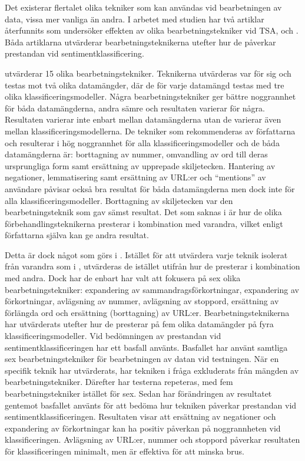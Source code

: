 \documentclass{kaumasters} %
\begin{document}
Det existerar flertalet olika tekniker som kan användas vid bearbetningen av data, vissa mer vanliga än andra. I arbetet med studien har två artiklar återfunnits som undersöker effekten av olika bearbetningstekniker vid TSA, \cite{effrosynidis2017comparison} och \cite{7862202}. Båda artiklarna utvärderar bearbetningsteknikerna utefter hur de påverkar prestandan vid sentimentklassificering.

\cite{effrosynidis2017comparison} utvärderar 15 olika bearbetningstekniker. Teknikerna utvärderas var för sig och testas mot två olika datamängder, där de för varje datamängd testas med tre olika klassificeringsmodeller.  Några bearbetningstekniker ger bättre noggrannhet för båda datamängderna, andra sämre och resultaten varierar för några. Resultaten varierar inte enbart mellan datamängderna utan de varierar även mellan klassificeringsmodellerna. De tekniker som rekommenderas av författarna och resulterar i hög noggrannhet för alla klassificeringsmodeller och de båda datamängderna är: borttagning av nummer, omvandling av ord till deras ursprungliga form samt ersättning av upprepade skiljetecken. Hantering av negationer, lemmatisering samt ersättning av URL:er och “mentions” av användare påvisar också bra resultat för båda datamängderna men dock inte för alla klassificeringsmodeller. Borttagning av skiljetecken var den bearbetningsteknik som gav sämst resultat. Det som saknas i \cite{effrosynidis2017comparison} är hur de olika förbehandlingsteknikerna presterar i kombination med varandra, vilket enligt författarna själva kan ge andra resultat.

Detta är dock något som görs i \cite{7862202}. Istället för att utvärdera varje teknik isolerat från varandra som i \cite{effrosynidis2017comparison}, utvärderas de istället utifrån hur de presterar i kombination med andra. Dock har de enbart har valt att fokusera på sex olika bearbetningstekniker: expandering av sammandragsförkortningar, expandering av förkortningar, avlägsning av nummer, avlägsning av stoppord, ersättning av förlängda ord och ersättning (borttagning) av URL:er. Bearbetningsteknikerna har utvärderats utefter hur de presterar på fem olika datamängder på fyra klassificeringsmodeller. Vid bedömningen av prestandan vid sentimentklassificeringen har ett basfall använts. Basfallet har använt samtliga sex bearbetningstekniker för bearbetningen av datan vid testningen. När en specifik teknik har utvärderats, har tekniken i fråga exkluderats från mängden av bearbetningstekniker. Därefter har testerna repeteras, med fem bearbetningstekniker istället för sex. Sedan har förändringen av resultatet gentemot basfallet använts för att bedöma hur tekniken påverkar prestandan vid sentimentklassificeringen. Resultaten visar att ersättning av negationer och expandering av förkortningar kan ha positiv påverkan på noggrannheten vid klassificeringen. Avlägsning av URL:er, nummer och stoppord påverkar resultaten för klassificeringen minimalt, men är effektiva för att minska brus. 
\end{document}
